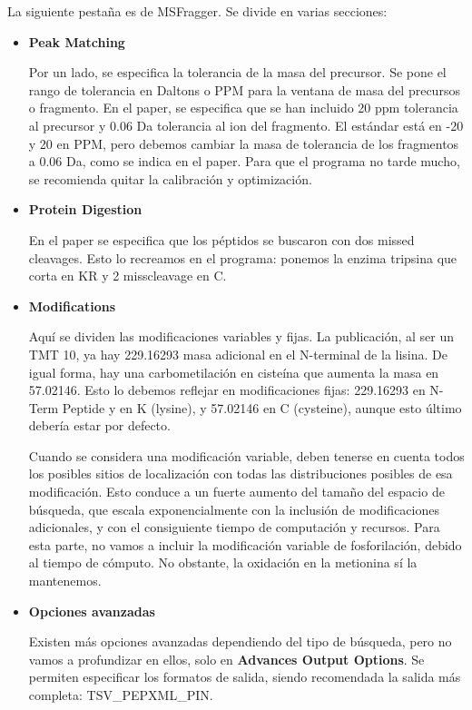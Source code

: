\documentclass[nochap]{config/ejercicios}
\begin{document}
La siguiente pestaña es de MSFragger. Se divide en varias secciones:
\begin{itemize}
\item \textbf{Peak Matching}

Por un lado, se especifica la tolerancia de la masa del precursor. Se pone el rango de tolerancia en Daltons o PPM para la ventana de masa del precursos o fragmento. En el paper, se especifica que se han incluido 20 ppm tolerancia al precursor y 0.06 Da tolerancia al ion del fragmento. El estándar está en -20 y 20 en PPM, pero debemos cambiar la masa de tolerancia de los fragmentos a 0.06 Da, como se indica en el paper. Para que el programa no tarde mucho, se recomienda quitar la calibración y optimización. 

\item \textbf{Protein Digestion}

En el paper se especifica que los péptidos se buscaron con dos missed cleavages. Esto lo recreamos en el programa: ponemos la enzima tripsina que corta en KR y 2 misscleavage en C.

\item \textbf{Modifications}

Aquí se dividen las modificaciones variables y fijas. La publicación, al ser un TMT 10, ya hay 229.16293 masa adicional en el N-terminal de la lisina. De igual forma, hay una carbometilación en cisteína que aumenta la masa en 57.02146. Esto lo debemos reflejar en modificaciones fijas: 229.16293 en N-Term Peptide y en K (lysine), y 57.02146 en C (cysteine), aunque esto último debería estar por defecto. 

Cuando se considera una modificación variable, deben tenerse en cuenta todos los posibles sitios de localización con todas las distribuciones posibles de esa modificación. Esto conduce a un fuerte aumento del tamaño del espacio de búsqueda, que escala exponencialmente con la inclusión de modificaciones adicionales, y con el consiguiente tiempo de computación y recursos. Para esta parte, no vamos a incluir la modificación variable de fosforilación, debido al tiempo de cómputo. No obstante, la oxidación en la metionina sí la mantenemos.

\item \textbf{Opciones avanzadas}

Existen más opciones avanzadas dependiendo del tipo de búsqueda, pero no vamos a profundizar en ellos, solo en \textbf{Advances Output Options}. Se permiten especificar los formatos de salida, siendo recomendada la salida más completa: TSV\_PEPXML\_PIN.
\end{itemize}
\end{document}
